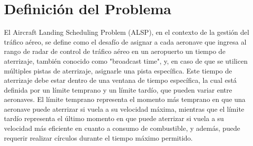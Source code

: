 \documentclass[letter, 10pt]{article}
\begin{document}
\section{Definici\'on del Problema}
\begin{comment}
Explicaci\'on del problema que se va a estudiar, en qu\'e consiste, cu\'ales son sus variables , restricciones y objetivo(s) de manera general (en palabras, no una formulaci\'on matem\'atica). Debe entenderse claramente el problema y qu\'e busca resolver.
Explicar si existen problemas relacionados.
Destacar, si existen, las variantes m\'as conocidas.\\
Redactar en tercera persona, sin faltas de ortograf\'ia y referenciar correctamente sus fuentes mediante el comando  \verb+\cite{ }+. Por ejemplo, para hacer referencia al art\'iculo de algoritmos h\'ibridos para problemas de satisfacci\'on 
 de restricciones~\cite{Prosser93Hybrid}.
\end{comment}


El Aircraft Landing Scheduling Problem (ALSP), en el contexto de la gesti\'on del tr\'afico a\'ereo, se define como el desaf\'io de asignar a cada aeronave que ingresa al rango de radar de control de tr\'afico a\'ereo en un aeropuerto un tiempo de aterrizaje, tambi\'en conocido como "broadcast time", y, en caso de que se utilicen m\'ultiples pistas de aterrizaje, asignarle una pista espec\'ifica. Este tiempo de aterrizaje debe estar dentro de una ventana de tiempo espec\'ifica, la cual est\'a definida por un l\'imite temprano y un l\'imite tard\'io, que pueden variar entre aeronaves. El l\'imite temprano representa el momento m\'as temprano en que una aeronave puede aterrizar si vuela a su velocidad m\'axima, mientras que el l\'imite tard\'io representa el \'ultimo momento en que puede aterrizar si vuela a su velocidad m\'as eficiente en cuanto a consumo de combustible, y adem\'as, puede requerir realizar c\'irculos durante el tiempo m\'aximo permitido. \\
\end{document}
